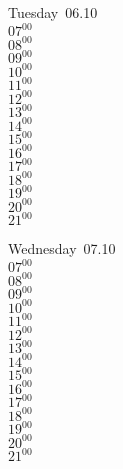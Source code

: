 \documentclass[11pt,a4paper]{book}\usepackage[]{graphicx}\usepackage[]{color}
\begin{document}
{{{{{{{{{{{{{%
\begin{tcolorbox}
Tuesday~06.10\\
{ 
$07^{00}$\\
$08^{00}$\\
$09^{00}$\\
$10^{00}$\\
$11^{00}$\\
$12^{00}$\\
$13^{00}$\\
$14^{00}$\\
$15^{00}$\\
$16^{00}$\\
$17^{00}$\\
$18^{00}$\\
$19^{00}$\\
$20^{00}$\\
$21^{00}$}\\
\end{tcolorbox}
%
\begin{tcolorbox}
Wednesday~07.10\\
{ 
$07^{00}$\\
$08^{00}$\\
$09^{00}$\\
$10^{00}$\\
$11^{00}$\\
$12^{00}$\\
$13^{00}$\\
$14^{00}$\\
$15^{00}$\\
$16^{00}$\\
$17^{00}$\\
$18^{00}$\\
$19^{00}$\\
$20^{00}$\\
$21^{00}$}\\
\end{tcolorbox}
\clearpage
%
}}}}}}}}}}}}}
\end{document}
